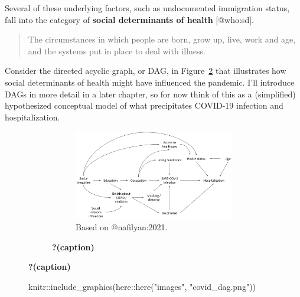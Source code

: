 \documentclass[
  letterpaper,
  DIV=11,
  numbers=noendperiod,
  oneside]{scrartcl}
\newenvironment{Shaded}{\begin{snugshade}}{\end{snugshade}}
\newcommand{\FunctionTok}[1]{\textcolor[rgb]{0.28,0.35,0.67}{#1}}
\newcommand{\NormalTok}[1]{\textcolor[rgb]{0.00,0.23,0.31}{#1}}
\newcommand{\SpecialCharTok}[1]{\textcolor[rgb]{0.37,0.37,0.37}{#1}}
\newcommand{\StringTok}[1]{\textcolor[rgb]{0.13,0.47,0.30}{#1}}
\begin{document}
Several of these underlying factors, such as undocumented immigration
status, fall into the category of \textbf{social determinants of health}
{[}@who:sd{]}.

\begin{quote}
The circumstances in which people are born, grow up, live, work and age,
and the systems put in place to deal with illness.
\end{quote}

Consider the directed acyclic graph, or DAG, in
Figure~\ref{fig-coviddag} that illustrates how social determinants of
health might have influenced the pandemic. I'll introduce DAGs in more
detail in a later chapter, so for now think of this as a (simplified)
hypothesized conceptual model of what precipitates COVID-19 infection
and hospitalization.

\begin{figure}

\begin{figure}

{\centering 

\begin{figure}

{\centering \includegraphics{images/covid_dag.png}

}

\caption{Based on @nafilyan:2021.}

\end{figure}

}

\caption{\label{fig-coviddag}\textbf{?(caption)}}

\end{figure}

\end{figure}

\begin{figure}

\begin{Shaded}
\begin{Highlighting}[]
\NormalTok{knitr}\SpecialCharTok{::}\FunctionTok{include\_graphics}\NormalTok{(here}\SpecialCharTok{::}\FunctionTok{here}\NormalTok{(}\StringTok{"images"}\NormalTok{, }\StringTok{"covid\_dag.png"}\NormalTok{)) }
\end{Highlighting}
\end{Shaded}

\end{figure}
\end{document}
